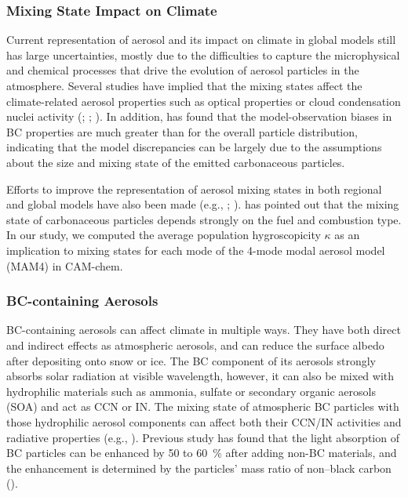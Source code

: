 \documentclass[12pt, fullpage]{uiucthesis2009}
\begin{document}
	\subsubsection{Mixing State Impact on Climate}
	Current representation of aerosol and its impact on climate in global models still has large uncertainties, mostly due to the difficulties to capture the microphysical and chemical processes that drive the evolution of aerosol particles in the atmosphere. Several studies have implied that the mixing states affect the climate-related aerosol properties such as optical properties or cloud condensation nuclei activity (\cite{jacobson2001strong}; \cite{zaveri2010contributions}; \cite{koch2009evaluation}). In addition, \cite{Reddington2013} has found that the model-observation biases in BC properties are much greater than for the overall particle distribution, indicating that the model discrepancies can be largely due to the assumptions about the size and mixing state of the emitted carbonaceous particles. 
	
	Efforts to improve the representation of aerosol mixing states in both regional and global models have also been made (e.g., \cite{jacobson2001strong}; \cite{Riemer2013}). \cite{Riemer2013} has pointed out that the mixing state of carbonaceous particles depends strongly on the fuel and combustion type. In our study, we computed the average population hygroscopicity $\kappa$ as an implication to mixing states for each mode of the 4-mode modal aerosol model (MAM4) in CAM-chem.
	
	\subsubsection{BC-containing Aerosols}
	BC-containing aerosols can affect climate in multiple ways. They have both direct and indirect effects as atmospheric aerosols, and can reduce the surface albedo after depositing onto snow or ice. The BC component of its aerosols strongly absorbs solar radiation at visible wavelength, however, it can also be mixed with hydrophilic materials such as ammonia, sulfate or secondary organic aerosols (SOA) and act as CCN or IN. The mixing state of atmospheric BC particles with those hydrophilic aerosol components can affect both their CCN/IN activities and radiative properties (e.g., \cite{cheng2006}). Previous study has found that the light absorption of BC particles can be enhanced by 50 to 60~$\%$ after adding non-BC materials, and the enhancement is determined by the particles' mass ratio of non--black carbon (\cite{liu2017black}). 
	
\end{document}
